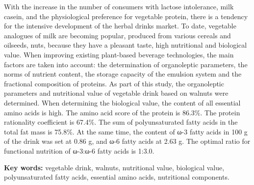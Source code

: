With the increase in the number of consumers with lactose intolerance,
milk casein, and the physiological preference for vegetable protein,
there is a tendency for the intensive development of the herbal drinks
market. To date, vegetable analogues of milk are becoming popular,
produced from various cereals and oilseeds, nuts, because they have a
pleasant taste, high nutritional and biological value. When improving
existing plant-based beverage technologies, the main factors are taken
into account: the determination of organoleptic parameters, the norms of
nutrient content, the storage capacity of the emulsion system and the
fractional composition of proteins. As part of this study, the
organoleptic parameters and nutritional value of vegetable drink based
on walnuts were determined. When determining the biological value, the
content of all essential amino acids is high. The amino acid score of
the protein is 86.3\%. The protein rationality coefficient is 67.4\%.
The sum of polyunsaturated fatty acids in the total fat mass is 75.8\%.
At the same time, the content of ω-3 fatty acids in 100 g of the drink
was set at 0.86 g, and ω-6 fatty acids at 2.63 g. The optimal ratio for
functional nutrition of ω-3:ω-6 fatty acids is 1:3.0.

{\bfseries Key words:} vegetable drink, walnuts, nutritional value,
biological value, polyunsaturated fatty acids, essential amino acids,
nutritional components.


